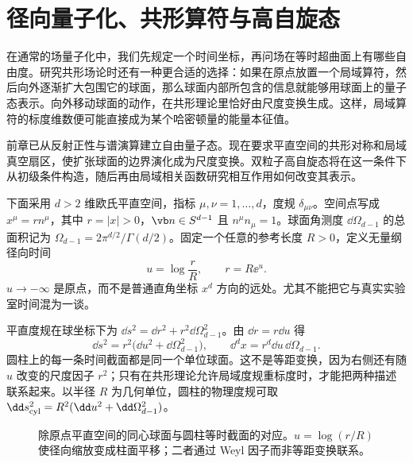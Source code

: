 \chapter{径向量子化、共形算符与高自旋态}\label{chap:ghs-radial-highspin-states}
\label{chap:ghs-radial-quantization}
\label{chap:ghs-interaction-anomalous-dimensions}



在通常的场量子化中，我们先规定一个时间坐标，再问场在等时超曲面上有哪些自由度。研究共形场论时还有一种更合适的选择：如果在原点放置一个局域算符，然后向外逐渐扩大包围它的球面，那么球面内部所包含的信息就能够用球面上的量子态表示。向外移动球面的动作，在共形理论里恰好由尺度变换生成。这样，局域算符的标度维数便可能直接成为某个哈密顿量的能量本征值。

前章已从反射正性与谱演算建立自由量子态。现在要求平直空间的共形对称和局域真空扇区，使扩张球面的边界演化成为尺度变换。双粒子高自旋态将在这一条件下从初级条件构造，随后再由局域相关函数研究相互作用如何改变其表示。

下面采用 $d>2$ 维欧氏平直空间，指标 $\mu,\nu=1,\ldots,d$，度规 $\delta_{\mu\nu}$。空间点写成 $x^\mu=r n^\mu$，其中 $r=|x|>0$，$\vb n\in S^{d-1}$ 且 $n^\mu n_\mu=1$。球面角测度 $\dd\Omega_{d-1}$ 的总面积记为 $\Omega_{d-1}=2\pi^{d/2}/\Gamma(d/2)$。固定一个任意的参考长度 $R>0$，定义无量纲径向时间
\begin{equation}\label{eq:ghs-radial-time}
 u=\log\frac rR,\qquad r=R\ee^u.
\end{equation}
$u\to-\infty$ 是原点，而不是普通直角坐标 $x^d$ 方向的远处。尤其不能把它与真实实验室时间混为一谈。


平直度规在球坐标下为 $\dd s^2=\dd r^2+r^2\dd\Omega_{d-1}^2$。由 $\dd r=r\dd u$ 得
\begin{equation}\label{eq:ghs-weyl-cylinder}
 \dd s^2=r^2\bigl(\dd u^2+\dd\Omega_{d-1}^2\bigr),\qquad
 \dd^d x=r^d\dd u\,\dd\Omega_{d-1}.
\end{equation}
圆柱上的每一条时间截面都是同一个单位球面。这不是等距变换，因为右侧还有随 $u$ 改变的尺度因子 $r^2$；只有在共形理论允许局域度规重标度时，才能把两种描述联系起来。以半径 $R$ 为几何单位，圆柱的物理度规可取 $\dd s_{\rm cyl}^2=R^2(\dd u^2+\dd\Omega_{d-1}^2)$。

\begin{figure}[htbp]
\centering

\caption{除原点平直空间的同心球面与圆柱等时截面的对应。$u=\log(r/R)$ 使径向缩放变成柱面平移；二者通过 Weyl 因子而非等距变换联系。}\label{fig:ghs-radial-annulus-cylinder}
\end{figure}

